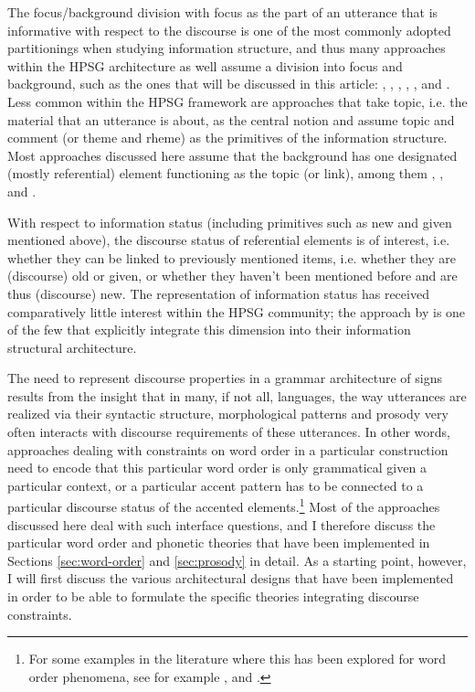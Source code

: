 \documentclass[output=paper]{langsci/langscibook}
\begin{document}
The focus/background division with focus as the part of an utterance
that is informative with respect to the discourse is one of the most
commonly adopted partitionings when studying information structure, and
thus many approaches within the HPSG architecture as well assume a
division into focus and background, such as the ones that will be
discussed in this article: \cite{EV96a}, \cite{deKuthy2002a},
\cite{Webelhuth2007a-u}, \cite{Paggio2009a-u}, \cite{Bildhauer2008a},
\cite{song-bender:2012} and \cite{song2018}. Less common within the
HPSG framework are approaches that take topic, i.e. the material that
an utterance is about, as the central notion and assume topic and
comment (or theme and rheme) as the primitives of the information
structure. Most approaches discussed here assume that the background
has one designated (mostly referential) element functioning as the
topic (or link), among them \cite{EV96a}, \cite{deKuthy2002a},
\cite{Paggio2009a-u} and \cite{song2018}.

With respect to information status (including primitives such as new and
given mentioned above), the discourse status of referential elements is of
interest, i.e. whether they can be linked to previously mentioned
items, i.e. whether they are (discourse) old or given, or whether they
haven't been mentioned before and are thus (discourse) new. The
representation of information status has received comparatively little
interest within the HPSG community; the approach by
\cite{DeKuthy.Meurers-11} is one of the few that
explicitly integrate this dimension into their information structural
architecture.

The need to represent discourse properties in a grammar architecture
of signs results from the insight that in many, if not all, languages,
the way utterances are realized via their syntactic structure,
morphological patterns and prosody very often interacts with discourse
requirements of these utterances. In other words, approaches dealing
with constraints on word order in a particular construction need to
encode that this particular word order is only grammatical given a
particular context, or a particular accent pattern has to be connected
to a particular discourse status of the accented elements.\footnote{For some examples in the literature where this has been explored for word order phenomena, see for example \citet{ambridge.goldberg-08}, \citet{DeKuthy.Konietzko-19} and \citet{Culicover.Winkler-19}. }
Most of the approaches discussed here deal with such interface
questions, and I therefore discuss the particular word order and
phonetic theories that have been implemented in Sections \ref{sec:word-order}
and \ref{sec:prosody} in detail. As a starting point, however, I will first
discuss the various architectural designs that have been implemented in
order to be able to formulate the specific theories integrating
discourse constraints.
\end{document}
